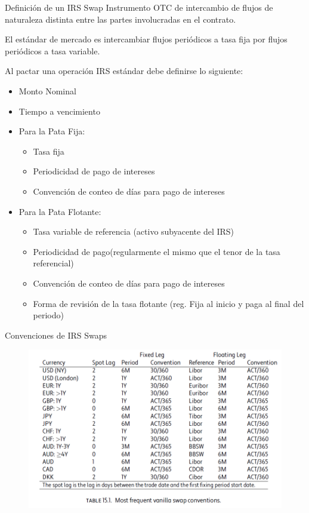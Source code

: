 \documentclass[11pt]{beamer}
\begin{document}
\begin{frame}{Definición de un IRS Swap}
	Instrumento OTC de intercambio de flujos de naturaleza distinta entre las partes involucradas en el contrato.
	
	El estándar de mercado es intercambiar flujos periódicos a tasa fija por flujos periódicos a tasa variable.
	
	Al pactar una operación IRS estándar  debe definirse lo siguiente:
	\begin{itemize}
		\item Monto Nominal
		\item Tiempo a vencimiento
		\item Para la Pata Fija:
		\begin{itemize}
			\item  Tasa fija
			\item Periodicidad de pago de intereses
			\item Convención de conteo de días para pago de intereses
		\end{itemize}
		
		\item Para la Pata Flotante:
		\begin{itemize}
			\item Tasa variable de referencia (activo subyacente del IRS)
			\item Periodicidad de pago(regularmente el mismo que el tenor de la tasa referencial)
			\item Convención de conteo de días para pago de intereses
			\item Forma de revisión de la tasa flotante (reg. Fija al inicio y paga al final del periodo)
		\end{itemize}
		
		
	\end{itemize}
\end{frame}

\begin{frame}{Convenciones de IRS Swaps}
	\begin{figure}
		\centering
		\includegraphics[width=0.7\linewidth]{quotes_swaps}
		\label{fig:quotesswaps}
	\end{figure}
	
\end{frame}
\end{document}
